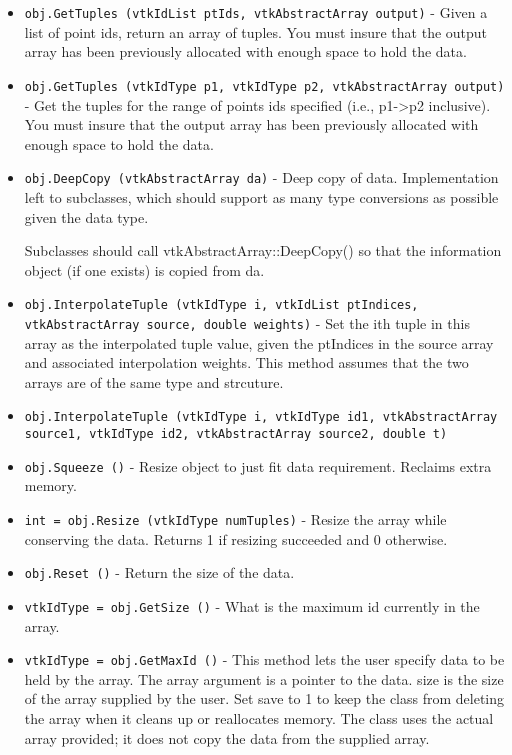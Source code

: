 \begin{itemize}
\item  \verb|obj.GetTuples (vtkIdList ptIds, vtkAbstractArray output)| -  Given a list of point ids, return an array of tuples.
 You must insure that the output array has been previously 
 allocated with enough space to hold the data.

\item  \verb|obj.GetTuples (vtkIdType p1, vtkIdType p2, vtkAbstractArray output)| -  Get the tuples for the range of points ids specified 
 (i.e., p1->p2 inclusive). You must insure that the output array has 
 been previously allocated with enough space to hold the data.

\item  \verb|obj.DeepCopy (vtkAbstractArray da)| -  Deep copy of data. Implementation left to subclasses, which
 should support as many type conversions as possible given the
 data type.

 Subclasses should call vtkAbstractArray::DeepCopy() so that the
 information object (if one exists) is copied from  da.

\item  \verb|obj.InterpolateTuple (vtkIdType i, vtkIdList ptIndices, vtkAbstractArray source, double weights)| -  Set the ith tuple in this array as the interpolated tuple value,
 given the ptIndices in the source array and associated 
 interpolation weights.
 This method assumes that the two arrays are of the same type
 and strcuture.

\item  \verb|obj.InterpolateTuple (vtkIdType i, vtkIdType id1, vtkAbstractArray source1, vtkIdType id2, vtkAbstractArray source2, double t)|

\item  \verb|obj.Squeeze ()| -  Resize object to just fit data requirement. Reclaims extra memory.

\item  \verb|int = obj.Resize (vtkIdType numTuples)| -  Resize the array while conserving the data.  Returns 1 if
 resizing succeeded and 0 otherwise.

\item  \verb|obj.Reset ()| -  Return the size of the data.

\item  \verb|vtkIdType = obj.GetSize ()| -  What is the maximum id currently in the array.

\item  \verb|vtkIdType = obj.GetMaxId ()| -  This method lets the user specify data to be held by the array.  The 
 array argument is a pointer to the data.  size is the size of 
 the array supplied by the user.  Set save to 1 to keep the class
 from deleting the array when it cleans up or reallocates memory.
 The class uses the actual array provided; it does not copy the data 
 from the supplied array.


\end{itemize}
